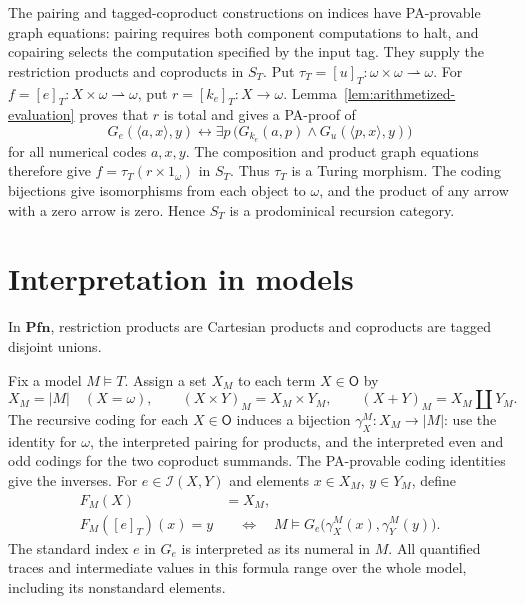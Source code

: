\documentclass[11pt]{article}
\newcommand{\Pfn}{\mathbf{Pfn}}
\begin{document}
The pairing and tagged-coproduct constructions on indices have
PA-provable graph equations: pairing requires both component
computations to halt, and copairing selects the computation
specified by the input tag. They supply the restriction products
and coproducts in $S_T$.
Put $\tau_T=[u]_T:\omega\times\omega\rightharpoonup\omega$.
For $f=[e]_T:X\times\omega\rightharpoonup\omega$, put
$r=[k_e]_T:X\to\omega$. Lemma~\ref{lem:arithmetized-evaluation}
proves that $r$ is total and gives a PA-proof of
\[
 G_e(\langle a,x\rangle,y)\leftrightarrow
 \exists p\,
 \bigl(G_{k_e}(a,p)\land G_u(\langle p,x\rangle,y)\bigr)
\]
for all numerical codes $a,x,y$.
The composition and product graph equations therefore give
$f=\tau_T(r\times1_\omega)$ in $S_T$.
Thus $\tau_T$ is a Turing morphism. The coding bijections give
isomorphisms from each object to $\omega$, and the product
of any arrow with a zero arrow is zero. Hence $S_T$ is a
prodominical recursion category.

\section{Interpretation in models}\label{sec:models}

In $\Pfn$, restriction products are Cartesian products and coproducts
are tagged disjoint unions.

Fix a model $M\models T$. Assign a set $X_M$ to each term
$X\in\mathsf O$ by
\[
 X_M=|M|\quad(X=\omega),\qquad
 (X\times Y)_M=X_M\times Y_M,\qquad
 (X+Y)_M=X_M\amalg Y_M.
\]
The recursive coding for each $X\in\mathsf O$ induces a bijection
$\gamma_X^M:X_M\to|M|$: use the identity for $\omega$, the
interpreted pairing for products, and the interpreted even and odd
codings for the two coproduct summands. The PA-provable coding
identities give the inverses. For $e\in\mathcal I(X,Y)$
and elements $x\in X_M$, $y\in Y_M$, define
\begin{equation}\label{eq:model-functor}
 \begin{aligned}
 F_M(X)&=X_M,\\
 F_M([e]_T)(x)=y
 &\quad\Longleftrightarrow\quad
 M\models G_e\bigl(\gamma_X^M(x),\gamma_Y^M(y)\bigr).
 \end{aligned}
\end{equation}
The standard index $e$ in $G_e$ is interpreted as its numeral in $M$.
All quantified traces and intermediate values in this formula range over
the whole model, including its nonstandard elements.
\end{document}

